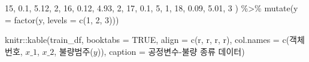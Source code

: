 \documentclass[
]{book}
\newenvironment{Shaded}{\begin{snugshade}}{\end{snugshade}}
\newcommand{\AttributeTok}[1]{\textcolor[rgb]{0.77,0.63,0.00}{#1}}
\newcommand{\ConstantTok}[1]{\textcolor[rgb]{0.00,0.00,0.00}{#1}}
\newcommand{\DecValTok}[1]{\textcolor[rgb]{0.00,0.00,0.81}{#1}}
\newcommand{\FloatTok}[1]{\textcolor[rgb]{0.00,0.00,0.81}{#1}}
\newcommand{\FunctionTok}[1]{\textcolor[rgb]{0.00,0.00,0.00}{#1}}
\newcommand{\NormalTok}[1]{#1}
\newcommand{\SpecialCharTok}[1]{\textcolor[rgb]{0.00,0.00,0.00}{#1}}
\newcommand{\StringTok}[1]{\textcolor[rgb]{0.31,0.60,0.02}{#1}}
\begin{document}
\begin{Shaded}
\begin{Highlighting}[]
  \DecValTok{15}\NormalTok{, }\FloatTok{0.1}\NormalTok{, }\FloatTok{5.12}\NormalTok{, }\DecValTok{2}\NormalTok{,}
  \DecValTok{16}\NormalTok{, }\FloatTok{0.12}\NormalTok{, }\FloatTok{4.93}\NormalTok{, }\DecValTok{2}\NormalTok{,}
  \DecValTok{17}\NormalTok{, }\FloatTok{0.1}\NormalTok{, }\DecValTok{5}\NormalTok{, }\DecValTok{1}\NormalTok{,}
  \DecValTok{18}\NormalTok{, }\FloatTok{0.09}\NormalTok{, }\FloatTok{5.01}\NormalTok{, }\DecValTok{3}
\NormalTok{) }\SpecialCharTok{\%\textgreater{}\%}
  \FunctionTok{mutate}\NormalTok{(}\AttributeTok{y =} \FunctionTok{factor}\NormalTok{(y, }\AttributeTok{levels =} \FunctionTok{c}\NormalTok{(}\DecValTok{1}\NormalTok{, }\DecValTok{2}\NormalTok{, }\DecValTok{3}\NormalTok{)))}

\NormalTok{knitr}\SpecialCharTok{::}\FunctionTok{kable}\NormalTok{(train\_df, }\AttributeTok{booktabs =} \ConstantTok{TRUE}\NormalTok{,}
             \AttributeTok{align =} \FunctionTok{c}\NormalTok{(}\StringTok{\textquotesingle{}r\textquotesingle{}}\NormalTok{, }\StringTok{\textquotesingle{}r\textquotesingle{}}\NormalTok{, }\StringTok{\textquotesingle{}r\textquotesingle{}}\NormalTok{, }\StringTok{\textquotesingle{}r\textquotesingle{}}\NormalTok{),}
             \AttributeTok{col.names =} \FunctionTok{c}\NormalTok{(}\StringTok{\textquotesingle{}객체번호\textquotesingle{}}\NormalTok{, }\StringTok{\textquotesingle{}$x\_1$\textquotesingle{}}\NormalTok{, }\StringTok{\textquotesingle{}$x\_2$\textquotesingle{}}\NormalTok{, }\StringTok{\textquotesingle{}불량범주($y$)\textquotesingle{}}\NormalTok{),}
             \AttributeTok{caption =} \StringTok{\textquotesingle{}공정변수{-}불량 종류 데이터\textquotesingle{}}\NormalTok{)}
\end{Highlighting}
\end{Shaded}
\end{document}
